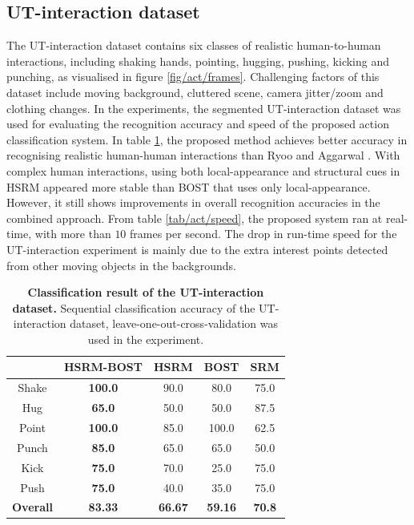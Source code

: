 \subsection{UT-interaction dataset}
The UT-interaction dataset contains six classes of realistic human-to-human interactions, including shaking hands, pointing, hugging, pushing, kicking and punching, as visualised in figure \ref{fig/act/frames}. 
Challenging factors of this dataset include moving background, cluttered scene, camera jitter/zoom and clothing changes. 
In the experiments, the segmented UT-interaction dataset was used for evaluating the recognition accuracy and speed of the proposed action classification system. 
In table \ref{tab/act/utcompare}, the proposed method achieves better accuracy in recognising realistic human-human interactions than Ryoo and Aggarwal \cite{Ryoo2009}. 
With complex human interactions, using both local-appearance and structural cues in HSRM appeared more stable than BOST that uses only local-appearance. 
However, it still shows improvements in overall recognition accuracies in the combined approach. 
From table \ref{tab/act/speed}, the proposed system ran at real-time, with more than $10$ frames per second. 
The drop in run-time speed for the UT-interaction experiment is mainly due to the extra interest points detected from other moving objects in the backgrounds.

\begin{table}
	\centering
	\begin{tabular}{|c|c|c|c|c|}
		\hline 
		\backslashbox{\textbf{Action}}{\textbf{Method}} & \textbf{HSRM-BOST} & \textbf{HSRM} & \textbf{BOST} & \textbf{SRM}\cite{Ryoo2009} \\
		\hline 
		Shake & \textbf{\color{blue}100.0} & 90.0 & 80.0 & 75.0 \\ 
		Hug & \textbf{\color{blue}65.0} & 50.0 & 50.0 & 87.5 \\ 
		Point & \textbf{\color{blue}100.0} & 85.0 & 100.0 & 62.5 \\ 
		Punch & \textbf{\color{blue}85.0} & 65.0 & 65.0 & 50.0 \\ 
		Kick & \textbf{\color{blue}75.0} & 70.0 & 25.0 & 75.0 \\ 
		Push & \textbf{\color{blue}75.0} & 40.0 & 35.0 & 75.0 \\ 
		\hline 	
		\textbf{ Overall } & \textbf{\color{blue}83.33} & \textbf{66.67} & \textbf{59.16} & \textbf{70.8} \\ 
		\hline 
	\end{tabular}
	\caption{\textbf{Classification result of the UT-interaction dataset.} Sequential classification accuracy of the UT-interaction dataset, leave-one-out-cross-validation was used in the experiment.}
	\label{tab/act/utcompare}
\end{table}

